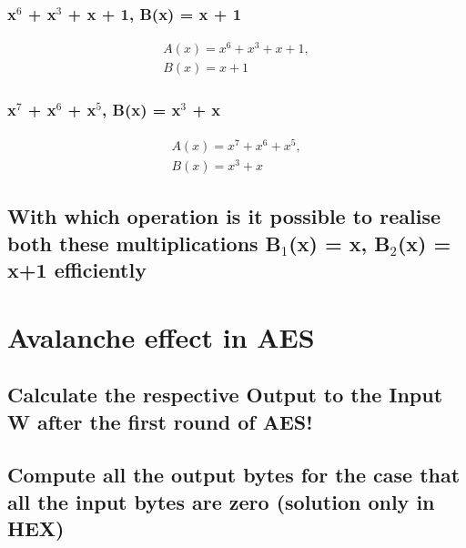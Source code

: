 \subsubsection{x$^{6}$ + x$^{3}$ + x + 1, B(x) = x + 1}
\label{section:3ab}
\begin{equation}
\begin{split}
A(x) = x^{6} + x^{3} + x + 1,  \\
B(x) = x + 1 
\end{split}
\end{equation}

\subsubsection{x$^{7}$ + x$^{6}$ + x$^{5}$, B(x) = x$^{3}$ + x}
\label{section:3ac}
\begin{equation}
\begin{split}
A(x) = x^{7} + x^{6} + x^{5}, \\ 
B(x) = x^{3} + x
\end{split}
\end{equation}

\subsection{With which operation is it possible to realise both these multiplications B$_{1}$(x) = x, B$_{2}$(x) = x+1 efficiently}
\label{section:3b}

\section{Avalanche effect in AES}
\begin{comment}
W = ($w_{0};w_{1};w_{2};w_{3}$) = (0x00000000; 0x00100000; 0x00000000; 0x00000000)

K0 = (0x2B7E1516)
(0x28AED2A6)
(0xABF71588)
(0x09CF4F3C)

K1 = (0xA0FAFE17)
(0x88542CB1)
(0x23A33939)
(0x2A6C7605)
\end{comment}

\subsection{Calculate the respective Output to the Input W after the first round of AES!}
\label{section:4a}

\subsection{Compute all the output bytes for the case that all the input bytes are zero (solution only in HEX)}
\label{section:4b}

